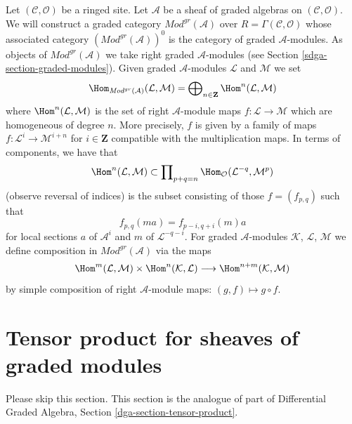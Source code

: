 \medskip\noindent
Let $(\mathcal{C}, \mathcal{O})$ be a ringed site.
Let $\mathcal{A}$ be a sheaf of graded algebras
on $(\mathcal{C}, \mathcal{O})$. We will construct
a graded category $\textit{Mod}^{gr}(\mathcal{A})$ over
$R = \Gamma(\mathcal{C}, \mathcal{O})$
whose associated category $(\textit{Mod}^{gr}(\mathcal{A}))^0$
is the category of graded $\mathcal{A}$-modules. As objects
of $\textit{Mod}^{gr}(\mathcal{A})$ we take right graded
$\mathcal{A}$-modules (see
Section \ref{sdga-section-graded-modules}). Given graded
$\mathcal{A}$-modules $\mathcal{L}$ and $\mathcal{M}$ we set
$$
\Hom_{\textit{Mod}^{gr}(\mathcal{A})}(\mathcal{L}, \mathcal{M}) =
\bigoplus\nolimits_{n \in \mathbf{Z}} \Hom^n(\mathcal{L}, \mathcal{M})
$$
where
$\Hom^n(\mathcal{L}, \mathcal{M})$
is the set of right $\mathcal{A}$-module maps
$f : \mathcal{L} \to \mathcal{M}$ which
are homogeneous of degree $n$. More precisely, $f$ is given
by a family of maps $f : \mathcal{L}^i \to \mathcal{M}^{i + n}$
for $i \in \mathbf{Z}$ compatible with the multiplication
maps. In terms of components, we have that
$$
\Hom^n(\mathcal{L}, \mathcal{M})
\subset
\prod\nolimits_{p + q = n}
\Hom_\mathcal{O}(\mathcal{L}^{-q}, \mathcal{M}^p)
$$
(observe reversal of indices) is the subset consisting of those
$f = (f_{p, q})$ such that
$$
f_{p, q}(m a) = f_{p - i, q + i}(m)a
$$
for local sections $a$ of $\mathcal{A}^i$ and
$m$ of $\mathcal{L}^{-q - i}$. For graded $\mathcal{A}$-modules
$\mathcal{K}$, $\mathcal{L}$, $\mathcal{M}$
we define composition in $\textit{Mod}^{gr}(\mathcal{A})$ via
the maps
$$
\Hom^m(\mathcal{L}, \mathcal{M}) \times
\Hom^n(\mathcal{K}, \mathcal{L}) \longrightarrow
\Hom^{n + m}(\mathcal{K}, \mathcal{M})
$$
by simple composition of right
$\mathcal{A}$-module maps: $(g, f) \mapsto g \circ f$.

\section{Tensor product for sheaves of graded modules}
\label{sdga-section-tensor-product}
Please skip this section. This section is the analogue of part of
Differential Graded Algebra, Section \ref{dga-section-tensor-product}.

